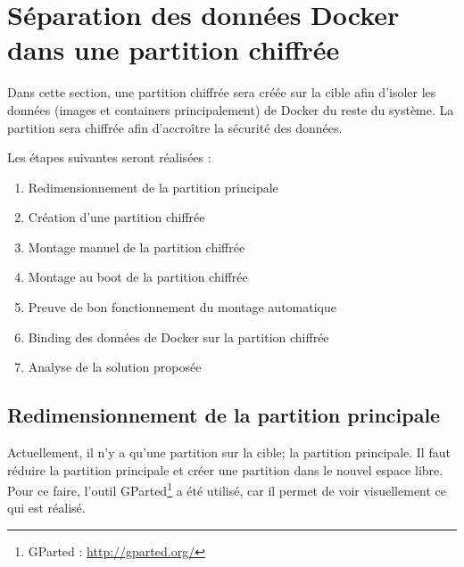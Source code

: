 \documentclass[11pt,a4paper,oneside]{report}
\begin{document}
\section{Séparation des données Docker dans une partition chiffrée}\label{partition_chiffree}
Dans cette section, une partition chiffrée sera créée sur la cible afin d'isoler les données (images et containers principalement) de Docker du reste du système. La partition sera chiffrée afin d'accroître la sécurité des données.

Les étapes suivantes seront réalisées :
\begin{enumerate}
\item Redimensionnement de la partition principale
\item Création d'une partition chiffrée
\item Montage manuel de la partition chiffrée
\item Montage au boot de la partition chiffrée
\item Preuve de bon fonctionnement du montage automatique
\item Binding des données de Docker sur la partition chiffrée
\item Analyse de la solution proposée
\end{enumerate}

\subsection{Redimensionnement de la partition principale}
Actuellement, il n'y a qu'une partition sur la cible; la partition principale. Il faut réduire la partition principale et créer une partition dans le nouvel espace libre. Pour ce faire, l'outil GParted\footnote{GParted : \url{http://gparted.org/}} a été utilisé, car il permet de voir visuellement ce qui est réalisé.
\end{document}
